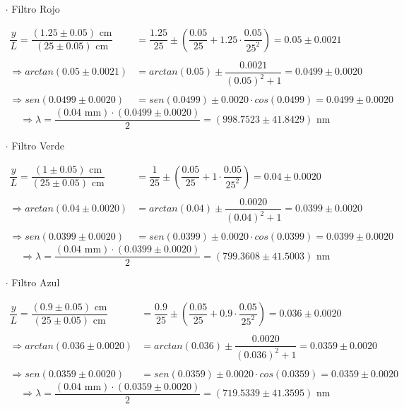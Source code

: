 \documentclass[12pt,a4paper]{article}
\begin{document}
 	\begin{itemize}
 		\item [$\cdot$] Filtro Rojo
 		
 		\begin{align*}
 			\dfrac{y}{L}=\dfrac{(1.25\pm 0.05)\mbox{ cm}}{(25\pm 0.05)\mbox{ cm}}&=
 			\dfrac{1.25}{25}\pm\left(\dfrac{0.05}{25}+1.25\cdot\dfrac{0.05}{25^2}\right)=
 			0.05 \pm 0.0021\\\\
 			\Longrightarrow arctan(	0.05 \pm 0.0021)&=
 			arctan(0.05)\pm\dfrac{0.0021}{(0.05)^2+1}=0.0499\pm 0.0020\\\\
 			\Longrightarrow sen(0.0499\pm 0.0020)&=sen(0.0499)\pm 0.0020\cdot cos(0.0499)=0.0499\pm0.0020
 		\end{align*}
 		$$\Longrightarrow \lambda=\dfrac{(0.04\mbox{ mm})\cdot(0.0499\pm0.0020)}{2}=
 		(998.7523\pm 41.8429)\mbox{ nm}$$
 		
 		

 		\item [$\cdot$] Filtro Verde

		\begin{align*}
			\dfrac{y}{L}=\dfrac{(1\pm 0.05)\mbox{ cm}}{(25\pm 0.05)\mbox{ cm}}&=
			\dfrac{1}{25}\pm\left(\dfrac{0.05}{25}+1\cdot\dfrac{0.05}{25^2}\right)=
			0.04 \pm 0.0020\\\\
			\Longrightarrow arctan(	0.04 \pm 0.0020)&=
			arctan(0.04)\pm\dfrac{0.0020}{(0.04)^2+1}=
			0.0399\pm 0.0020\\\\
			\Longrightarrow sen(0.0399\pm 0.0020)&=sen(0.0399)\pm 0.0020\cdot cos(0.0399)=0.0399\pm 0.0020
		\end{align*}
		$$\Longrightarrow \lambda=\dfrac{(0.04\mbox{ mm})\cdot(0.0399\pm 0.0020)}{2}=
		(799.3608\pm 41.5003)\mbox{ nm}$$
		
 		\item [$\cdot$] Filtro Azul
 		
 		\begin{align*}
 			\dfrac{y}{L}=\dfrac{(0.9\pm 0.05)\mbox{ cm}}{(25\pm 0.05)\mbox{ cm}}&=
 			\dfrac{0.9}{25}\pm\left(\dfrac{0.05}{25}+0.9\cdot\dfrac{0.05}{25^2}\right)=
 			0.036 \pm 0.0020\\\\
 			\Longrightarrow arctan(0.036 \pm 0.0020)&=
 			arctan(0.036)\pm\dfrac{0.0020}{(0.036)^2+1}=
 			0.0359\pm 0.0020\\\\
 			\Longrightarrow sen(0.0359\pm 0.0020)&=sen(0.0359)\pm 0.0020\cdot cos(0.0359)=0.0359\pm 0.0020
 		\end{align*}
 		$$\Longrightarrow \lambda=\dfrac{(0.04\mbox{ mm})\cdot(0.0359\pm 0.0020)}{2}=
 		(719.5339\pm 41.3595)\mbox{ nm}$$

 	\end{itemize}
 	
\end{document}
